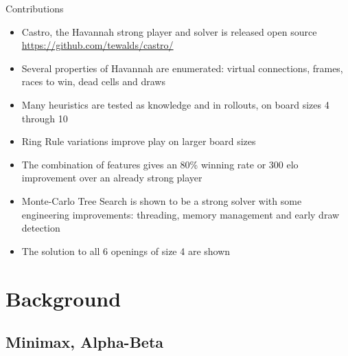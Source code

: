 \documentclass{beamer} %
\begin{document}
\begin{frame}{Contributions}
\begin{itemize}
	\item Castro, the Havannah strong player and solver is released open source \url{https://github.com/tewalds/castro/}
	\item Several properties of Havannah are enumerated: virtual connections, frames, races to win, dead cells and draws
	\item Many heuristics are tested as knowledge and in rollouts, on board sizes 4 through 10
	\item Ring Rule variations improve play on larger board sizes
	\item The combination of features gives an 80\% winning rate or 300 elo improvement over an already strong player
	\item Monte-Carlo Tree Search is shown to be a strong solver with some engineering improvements: threading, memory management and early draw detection
	\item The solution to all 6 openings of size 4 are shown
\end{itemize}
\end{frame}


\section{Background}

\subsection{Minimax, Alpha-Beta}
\end{document}
